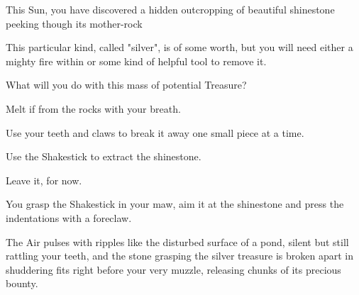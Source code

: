 



This Sun, you have discovered a hidden outcropping of beautiful shinestone
peeking though its mother-rock

This particular kind, called "silver", is of some worth, but you will need
either a mighty fire within or some kind of helpful tool to remove it.

What will you do with this mass of potential Treasure?

\option Melt if from the rocks with your breath.
 
	  
	  

\option Use your teeth and claws to break it away one small piece at a time.
 
	  
	 
	 
	 

\option Use the Shakestick to extract the shinestone.
 

\option Leave it, for now.
  


You grasp the Shakestick in your maw, aim it at the shinestone and press the
indentations with a foreclaw.

The Air pulses with ripples like the disturbed surface of a pond, silent but
still rattling your teeth, and the stone grasping the silver treasure is broken
apart in shuddering fits right before your very muzzle, releasing chunks of its
precious bounty.

